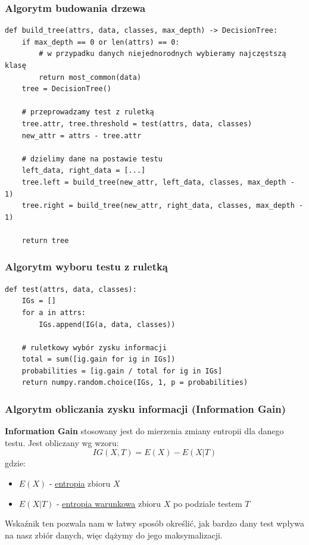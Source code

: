 \documentclass[11pt]{article}
\begin{document}
\subsubsection{Algorytm budowania drzewa}
\label{sec:org8d16fe2}
\begin{verbatim}
def build_tree(attrs, data, classes, max_depth) -> DecisionTree:
    if max_depth == 0 or len(attrs) == 0:
        # w przypadku danych niejednorodnych wybieramy najczęstszą klasę
        return most_common(data)
    tree = DecisionTree()

    # przeprowadzamy test z ruletką
    tree.attr, tree.threshold = test(attrs, data, classes)
    new_attr = attrs - tree.attr

    # dzielimy dane na postawie testu
    left_data, right_data = [...]
    tree.left = build_tree(new_attr, left_data, classes, max_depth - 1)
    tree.right = build_tree(new_attr, right_data, classes, max_depth - 1)

    return tree
\end{verbatim}
\subsubsection{Algorytm wyboru testu z ruletką}
\label{sec:orge6811b9}
\begin{verbatim}
def test(attrs, data, classes):
    IGs = []
    for a in attrs:
        IGs.append(IG(a, data, classes))

    # ruletkowy wybór zysku informacji
    total = sum([ig.gain for ig in IGs])
    probabilities = [ig.gain / total for ig in IGs]
    return numpy.random.choice(IGs, 1, p = probabilities)
\end{verbatim}
\subsubsection{Algorytm obliczania zysku informacji (Information Gain)}
\label{sec:org5372fdc}
\textbf{Information Gain} stosowany jest do mierzenia zmiany entropii dla danego testu. Jest obliczany wg wzoru:
$$
IG(X,T) = E(X) - E(X|T)
$$
gdzie:
\begin{itemize}
\item $E(X)$ - \hyperref[ent]{\underline{entropia}} zbioru $X$
\item $E(X|T)$ - \hyperref[entwar]{\underline{entropia warunkowa}} zbioru $X$ po podziale testem $T$
\end{itemize}
Wskaźnik ten pozwala nam w łatwy sposób określić, jak bardzo dany test wpływa na nasz zbiór danych, więc dążymy do jego maksymalizacji.
\end{document}

